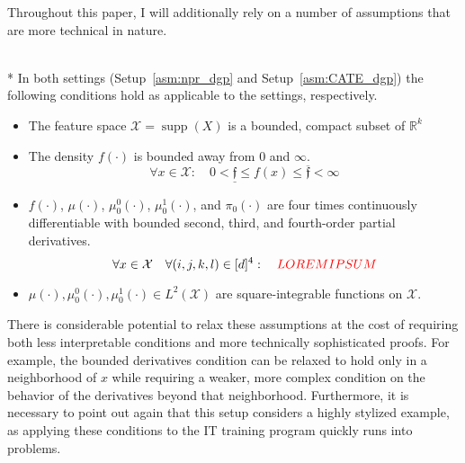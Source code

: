 Throughout this paper, I will additionally rely on a number of assumptions that are more technical in nature.
\begin{boxD}
	\begin{asm}\label{asm:technical}\mbox{}\\*
		In both settings (Setup~\ref{asm:npr_dgp} and Setup~\ref{asm:CATE_dgp}) the following conditions hold as applicable to the settings, respectively.
		\begin{itemize}
			\item The feature space $\mathcal{X} = \operatorname{supp}(X)$ is a bounded, compact subset of $\mathbb{R}^k$
			\item The density $f(\cdot)$ is bounded away from 0 and $\infty$.
            \begin{equation}
                \forall x \in \mathcal{X}: \quad 0 < \underline{\mathfrak{f}} \leq f(x) \leq \overline{\mathfrak{f}} < \infty
            \end{equation}
			\item $f(\cdot)$, $\mu(\cdot)$, $\mu_{0}^{0}(\cdot)$, $\mu_{0}^{1}(\cdot)$, and $\pi_{0}(\cdot)$ are four times continuously differentiable with bounded second, third, and fourth-order partial derivatives.
            \begin{equation}
                \forall x \in \mathcal{X} \quad \forall (i,j,k,l) \in [d]^{4}: \quad {\color{red} LOREM IPSUM}
            \end{equation}
            \item $\mu(\cdot), \mu_{0}^{0}(\cdot), \mu_{0}^{1}(\cdot) \in L^{2}\left(\mathcal{X}\right)$ are square-integrable functions on $\mathcal{X}$.
		\end{itemize}
	\end{asm}
\end{boxD}
There is considerable potential to relax these assumptions at the cost of requiring both less interpretable conditions and more technically sophisticated proofs. 
For example, the bounded derivatives condition can be relaxed to hold only in a neighborhood of $x$ while requiring a weaker, more complex condition on the behavior of the derivatives beyond that neighborhood.
Furthermore, it is necessary to point out again that this setup considers a highly stylized example, as applying these conditions to the IT training program quickly runs into problems.
